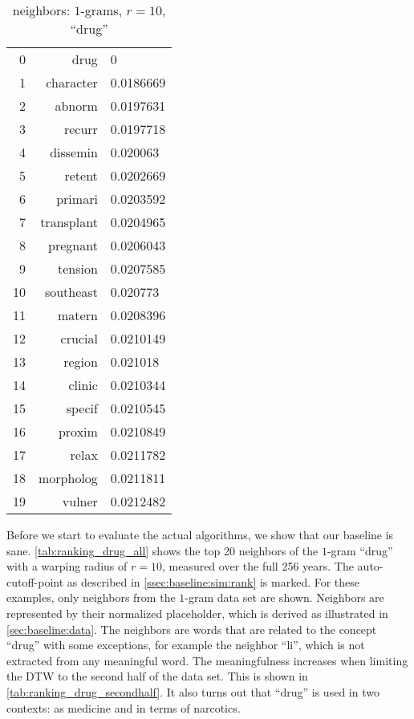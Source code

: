 \begin{table}[t]
\begin{subtable}[t]{.45\textwidth}
\begin{tabularx}{\textwidth}{r R l}
            \midrule
            \num{0} & drug & \num{0}\\
            \num{1} & character & \num{0.0186669}\\
            \num{2} & abnorm & \num{0.0197631}\\
            \num{3} & recurr & \num{0.0197718}\\
            \num{4} & dissemin & \num{0.020063}\\
            \num{5} & retent & \num{0.0202669}\\
            \num{6} & primari & \num{0.0203592}\\
            \num{7} & transplant & \num{0.0204965}\\
            \num{8} & pregnant & \num{0.0206043}\\
            \num{9} & tension & \num{0.0207585}\\
            \num{10} & southeast & \num{0.020773}\\
            \midrule
            \num{11} & matern & \num{0.0208396}\\
            \num{12} & crucial & \num{0.0210149}\\
            \num{13} & region & \num{0.021018}\\
            \num{14} & clinic & \num{0.0210344}\\
            \num{15} & specif & \num{0.0210545}\\
            \num{16} & proxim & \num{0.0210849}\\
            \num{17} & relax & \num{0.0211782}\\
            \num{18} & morpholog & \num{0.0211811}\\
            \num{19} & vulner & \num{0.0212482}\\
            \bottomrule
        \end{tabularx}
        \caption{$[129,256]$}\label{tab:ranking_drug_secondhalf}
    \end{subtable}
    \caption{neighbors: $1$-grams, $r = 10$, \enquote{drug}}\label{tab:ranking_drug_sane}
\end{table}

Before we start to evaluate the actual algorithms, we show that our baseline is sane. \autoref{tab:ranking_drug_all} shows the top \num{20} neighbors of the $1$-gram \enquote{drug} with a warping radius of $r = 10$, measured over the full \num{256} years. The auto-cutoff-point as described in \autoref{ssec:baseline:sim:rank} is marked. For these examples, only neighbors from the $1$-gram data set are shown. Neighbors are represented by their normalized placeholder, which is derived as illustrated in \autoref{sec:baseline:data}. The neighbors are words that are related to the concept \enquote{drug} with some exceptions, for example the neighbor \enquote{li}, which is not extracted from any meaningful word. The meaningfulness increases when limiting the DTW to the second half of the data set. This is shown in \autoref{tab:ranking_drug_secondhalf}. It also turns out that \enquote{drug} is used in two contexts: as medicine and in terms of narcotics.

